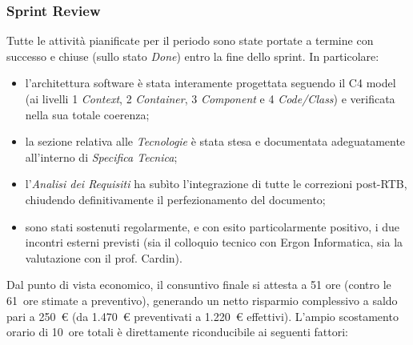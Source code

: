 \documentclass[a4paper, 11pt, oneside]{scrartcl} %
\begin{document}
\subsubsection*{Sprint Review}

Tutte le attività pianificate per il periodo sono state portate a termine con successo e chiuse (sullo stato \textit{Done}) entro la fine dello sprint. In particolare:
\begin{itemize}[noitemsep, topsep=2pt]
  \item l'architettura software è stata interamente progettata seguendo il C4 model (ai livelli 1 \textit{Context}, 2 \textit{Container}, 3 \textit{Component} e 4 \textit{Code/Class}) e verificata nella sua totale coerenza;
  \item la sezione relativa alle \textit{Tecnologie} è stata stesa e documentata adeguatamente all'interno di \textit{Specifica Tecnica};
  \item l'\textit{Analisi dei Requisiti} ha subìto l'integrazione di tutte le correzioni post-RTB, chiudendo definitivamente il perfezionamento del documento;
  \item sono stati sostenuti regolarmente, e con esito particolarmente positivo, i due incontri esterni previsti (sia il colloquio tecnico con Ergon Informatica, sia la valutazione con il prof. Cardin).
\end{itemize}
Dal punto di vista economico, il consuntivo finale si attesta a 51 ore (contro le 61~ore stimate a preventivo), generando un netto risparmio complessivo a saldo pari a 250~€ (da 1.470~€ preventivati a 1.220~€ effettivi). L'ampio scostamento orario di 10~ore totali è direttamente riconducibile ai seguenti fattori:
\end{document}
